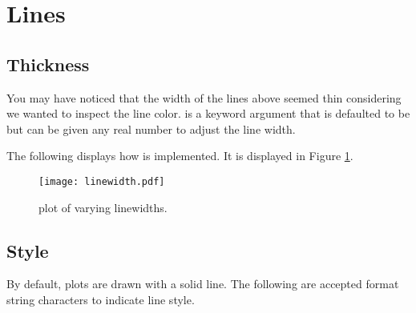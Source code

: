 
\section*{Lines} %

\subsection*{Thickness} %

You may have noticed that the width of the lines above seemed thin considering we wanted to inspect the line color.  is a keyword argument that is defaulted to be  but can be given any real number to adjust the line width.

The following displays how  is implemented.
It is displayed in Figure \ref{linewidth}.



\begin{figure} %
\texttt{[image: linewidth.pdf]}
\caption{plot of varying linewidths.}
\label{linewidth}
\end{figure}


\subsection*{Style} %

By default, plots are drawn with a solid line.
The following are accepted format string characters to indicate line style.

